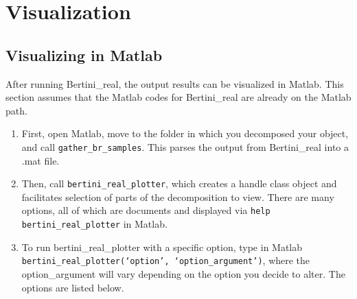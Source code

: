 
\section{Visualization}
\label{sec:visualization}






\subsection{Visualizing in Matlab}
After running Bertini\_real, the output results can be visualized in Matlab.  This section assumes that the Matlab codes for Bertini\_real are already on the Matlab path.

\begin{enumerate}
\item First, open Matlab, move to the folder in which you decomposed your object, and call \texttt{gather\_br\_samples}. This parses the output from Bertini\_real into a .mat file.
\item Then, call \texttt{bertini\_real\_plotter\-}, which creates a handle class object and facilitates selection of parts of the decomposition to view. There are many options, all of which are documents and displayed via \texttt{help bertini\_real\_plotter\-} in Matlab.
\item To run bertini\_real\_plotter with a specific option, type in Matlab\\
	\texttt{bertini\_real\_plotter\-(`option', `option\_argument')}, where the option\_argument will vary depending on the option you decide to alter. The options are listed below.
\end{enumerate}


